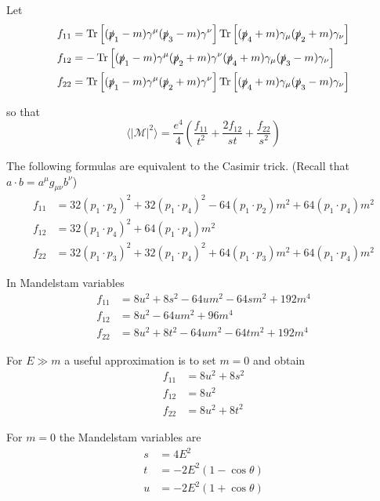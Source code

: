 Let
\begin{align*}
f_{11}&=\operatorname{Tr}\left[
(\slashed p_1-m)\gamma^\mu(\slashed p_3-m)\gamma^\nu
\right]
\operatorname{Tr}\left[
(\slashed p_4+m)\gamma_\mu(\slashed p_2+m)\gamma_\nu
\right]
\\
f_{12}&=-\operatorname{Tr}\left[
(\slashed p_1-m)\gamma^\mu(\slashed p_2+m)\gamma^\nu
(\slashed p_4+m)\gamma_\mu(\slashed p_3-m)\gamma_\nu
\right]
\\
f_{22}&=\operatorname{Tr}\left[
(\slashed p_1-m)\gamma^\mu(\slashed p_2+m)\gamma^\nu
\right]
\operatorname{Tr}\left[
(\slashed p_4+m)\gamma_\mu(\slashed p_3-m)\gamma_\nu
\right]
\end{align*}

so that
\begin{equation*}
\langle|\mathcal{M}|^2\rangle
=\frac{e^4}{4}
\left(
\frac{f_{11}}{t^2}+\frac{2f_{12}}{st}+\frac{f_{22}}{s^2}
\right)
\end{equation*}

The following formulas are equivalent to the Casimir trick.
(Recall that $a\cdot b=a^\mu g_{\mu\nu}b^\nu$)
\begin{align*}
f_{11}&=32 (p_1\cdot p_2)^2 + 32 (p_1\cdot p_4)^2 - 64 (p_1\cdot p_2) m^2 + 64 (p_1\cdot p_4) m^2
\\
f_{12}&=32 (p_1\cdot p_4)^2 + 64 (p_1\cdot p_4) m^2
\\
f_{22}&=32 (p_1\cdot p_3)^2 + 32 (p_1\cdot p_4)^2 + 64 (p_1\cdot p_3) m^2 + 64 (p_1\cdot p_4) m^2
\end{align*}

In Mandelstam variables
\begin{align*}
f_{11} &= 8 u^2 + 8 s^2 - 64 u m^2 - 64 s m^2 + 192 m^4
\\
f_{12} &= 8 u^2 - 64 u m^2 + 96 m^4
\\
f_{22} &= 8 u^2 + 8 t^2 - 64 u m^2 - 64 t m^2 + 192 m^4
\end{align*}

For $E\gg m$ a useful approximation is to set $m=0$ and obtain
\begin{align*}
f_{11}&=8u^2+8s^2
\\
f_{12}&=8u^2
\\
f_{22}&=8u^2+8t^2
\end{align*}

For $m=0$ the Mandelstam variables are
\begin{align*}
s&=4E^2
\\
t&=-2E^2(1-\cos\theta)
\\
u&=-2E^2(1+\cos\theta)
\end{align*}


